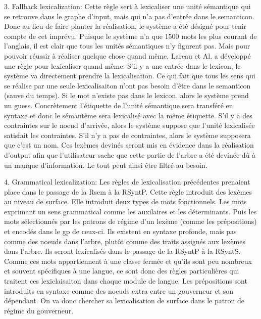 3. Fallback lexicalization: Cette règle sert à lexicaliser une unité sémantique qui se retrouve dans le graphe d'input, mais qui n'a pas d'entrée dans le semanticon. Donc au lieu de faire planter la réalisation, le système a été désigné pour tenir compte de cet imprévu. Puisque le système n'a que 1500 mots les plus courant de l'anglais, il est clair que tous les unités sémantiques n'y figurent pas. Mais pour pouvoir réussir à réaliser quelque chose quand même. Lareau et Al. a développé une règle pour lexicaliser quand même. S'il y a une entrée dans le lexicon, le système va directement prendre la lexicalisation. Ce qui fait que tous les sens qui se réalise par une seule lexicalisaiton n'ont pas besoin d'être dans le semanticon (sauve du temps). Si le mot n'existe pas dans le lexicon, alors le système prend un guess. Concrètement l'étiquette de l'unité sémantique sera transféré en syntaxe et donc le sémantème sera lexicalisé avec la même étiquette. S'il y a des contraintes sur le noeud d'arrivée, alors le système suppose que l'unité lexicalisée satisfait les contraintes. S'il n'y a pas de contraintes, alors le système supposera que c'est un nom. Ces lexèmes devinés seront mis en évidence dans la réalisation d'output afin que l'utilisateur sache que cette partie de l'arbre a été devinée dû à un manque d'information. Le tout peut ainsi être filtré au besoin.
	
4. Grammatical lexicalization: Les règles de lexicalisation précédentes prenaient place dans le passage de la Rsem à la RSyntP. Cette règle introduit des lexèmes au niveau de surface. Elle introduit deux types de mots fonctionnels. Les mots exprimant un sens grammatical comme les auxilaires et les déterminants. Puis les mots sélectionnés par les patrons de régime d'un lexème (comme les prépositions) et encodés dans le gp de ceux-ci. Ils existent en syntaxe profonde, mais pas comme des noeuds dans l'arbre, plutôt comme des traits assignés aux lexèmes dans l'arbre. Ils seront lexicalisés dans le passage de la RSyntP à la RSyntS. Comme ces mots appartiennent à une classe fermée et qu'ils sont peu nombreux et souvent spécifiques à une langue, ce sont donc des règles particulières qui traitent ces lexiclaisaiton dans chaque module de langue. Les prépositions sont introduits en syntaxe comme des noeuds extra entre un gouverneur et son dépendant. On va donc chercher sa lexicalisation de surface dans le patron de régime du gouverneur. 



